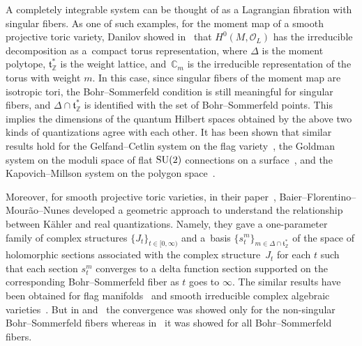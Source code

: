 \documentclass[pdftex]{sigma}
\numberwithin{equation}{section}
\newcommand{\C}{\mathbb{C}}
\newcommand{\Z}{\mathbb{Z}}
\newcommand{\CO}{\mathcal O}
\def\t{\mathfrak t}
\begin{document}
A completely integrable system can be thought of as a Lagrangian fibration with singular fibers. As one of such examples, for the moment map of a smooth projective toric variety, Danilov showed in~\cite{Dan} that $H^0(M,\CO_L)$ has the irreducible decomposition \smash{$H^0(M,\CO_L)=\bigoplus_{m \in\Delta \cap \t^*_{\Z}}\C_m$} as a~compact torus representation, where $\Delta$ is the moment polytope, $\t^*_{\Z}$ is the weight lattice, and~$\C_m$ is the irreducible representation of the torus with weight $m$. In this case, since singular fibers of the moment map are isotropic tori, the Bohr--Sommerfeld condition is still meaningful for singular fibers, and $\Delta \cap \t^*_{\Z}$ is identified with the set of Bohr--Sommerfeld points. This implies the dimensions of the quantum Hilbert spaces obtained by the above two kinds of quantizations agree with each other. It has been shown that similar results hold for the Gelfand--Cetlin system on the flag variety~\cite{GuS4}, the Goldman system on the moduli space of flat ${\rm SU}(2)$ connections on a surface~\cite{JW1}, and the Kapovich--Millson system on the polygon space~\cite{Kamiyama}.

Moreover, for smooth projective toric varieties, in their paper~\cite{BFMN}, Baier--Florentino--Mour\~ao--Nunes developed a geometric approach to understand the relationship between K\"ahler and real quantizations. Namely, they gave a one-parameter family of complex structures $\{J_t\}_{t\in[0,\infty)}$ and a~basis $\{s_t^m\}_{m\in \Delta \cap \t^*_{\Z}}$ of the space of holomorphic sections associated with the complex structure~$J_t$ for each $t$ such that each section $s_t^m$ converges to a delta function section supported on the corresponding Bohr--Sommerfeld fiber as $t$ goes to $\infty$. The similar results have been obtained for flag manifolds~\cite{Hamilton-Konno} and smooth irreducible complex algebraic varieties~\cite{Hamilton-Harada-Kaveh}. But in \cite{Hamilton-Konno} and~\cite{Hamilton-Harada-Kaveh} the convergence was showed only for the non-singular Bohr--Sommerfeld fibers whereas in~\cite{BFMN} it was showed for all Bohr--Sommerfeld fibers.
\end{document}
